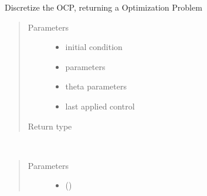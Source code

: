 \documentclass[letterpaper,10pt,english]{sphinxmanual}
\begin{document}
\begin{fulllineitems}
\begin{fulllineitems}
\end{fulllineitems}


\begin{fulllineitems}
\label{\detokenize{yaocptool.methods.classic:yaocptool.methods.classic.collocationscheme.CollocationScheme.discretize}}
Discretize the OCP, returning a Optimization Problem
\begin{quote}\begin{description}
\item[{Parameters}] \leavevmode\begin{itemize}
\item {} 
 \textendash{} initial condition

\item {} 
 \textendash{} parameters

\item {} 
 \textendash{} theta parameters

\item {} 
 \textendash{} last applied control

\end{itemize}

\item[{Return type}] \leavevmode
{\hyperref[\detokenize{yaocptool.optimization:yaocptool.optimization.nonlinear_problem.NonlinearOptimizationProblem}]{}}

\end{description}\end{quote}

\end{fulllineitems}


\begin{fulllineitems}
\label{\detokenize{yaocptool.methods.classic:yaocptool.methods.classic.collocationscheme.CollocationScheme.get_system_at_given_times}}~\begin{quote}\begin{description}
\item[{Parameters}] \leavevmode\begin{itemize}
\item {} 
 () \textendash{} 


\end{itemize}
\end{description}
\end{quote}
\end{fulllineitems}
\end{fulllineitems}
\end{document}
